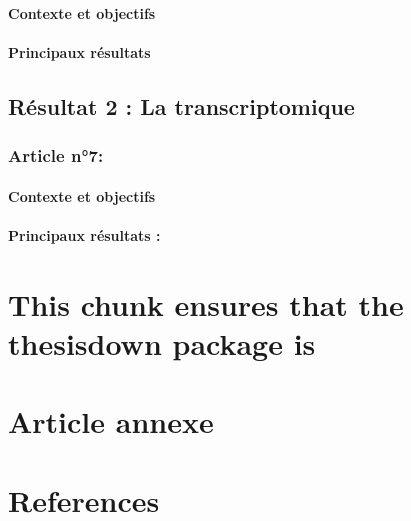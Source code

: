 \documentclass[12pt,twoside]{ugathesis}
\begin{document}
\subsubsection{Contexte et objectifs}\label{contexte-et-objectifs-5}

\subsubsection{Principaux résultats}\label{principaux-resultats-5}

\section{Résultat 2 : La transcriptomique}\label{transcriptome}

\subsection{Article n°7:}\label{article-n7}

\subsubsection{Contexte et objectifs}\label{contexte-et-objectifs-6}

\subsubsection{Principaux résultats :}\label{principaux-resultats-6}

\chapter{This chunk ensures that the thesisdown package
is}\label{this-chunk-ensures-that-the-thesisdown-package-is}

\chapter{Article annexe}\label{dnah12014}

\chapter*{References}\label{references}


\end{document}
